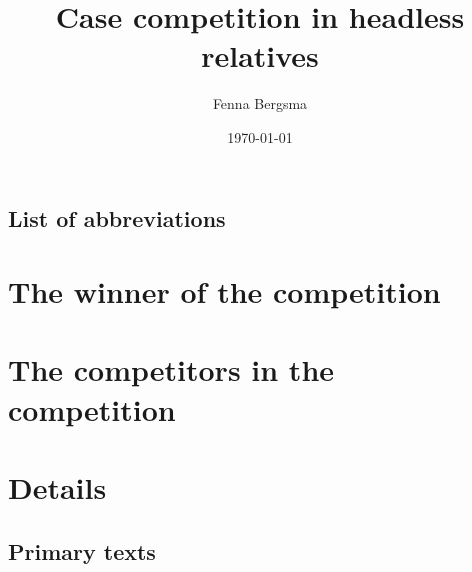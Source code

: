 \documentclass[11pt]{memoir}
\title{Case competition in headless relatives}
\author{Fenna Bergsma}
\date{\today}
\begin{document}
\maketitle

\frontmatter

\clearpage
\tableofcontents

\clearpage
\listoftables

\chapter*{List of abbreviations}
\begingroup
  \setlength{\LTleft}{-\tabcolsep}
\printacronyms[include-classes=abbr, heading=none]
\endgroup
{}


\mainmatter
\setcounter{secnumdepth}{4}



\part{The winner of the competition}\label{part:complexity}



\part{The competitors in the competition}\label{part:direction}



\part{Details}\label{part:details}




\backmatter

\clearpage
\chapter*{Primary texts}
\printacronyms[include-classes=texts, heading=none]

\printbibliography

\end{document}
